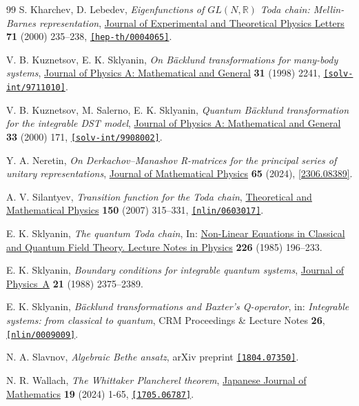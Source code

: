 \documentclass[11pt]{article}
\numberwithin{equation}{section}
\theoremstyle{plain}
\theoremstyle{definition}
\begin{document}
\begin{thebibliography}{99}
	 S. Kharchev, D. Lebedev, \textit{Eigenfunctions of $GL(N,\mathbb{R})$ Toda chain: Mellin-Barnes representation}, \href{https://doi.org/10.1134/1.568323}{Journal of Experimental and Theoretical Physics Letters} \textbf{71} (2000) 235--238, \href{https://doi.org/10.48550/arXiv.hep-th/0004065}{\tt [hep-th/0004065]}.
	
	 V. B. Kuznetsov, E. K. Sklyanin, \textit{On B\"acklund transformations for many-body systems}, \href{https://doi.org/10.1088/0305-4470/31/9/012}{Journal of Physics A: Mathematical and General} \textbf{31} (1998) 2241, \href{https://doi.org/10.48550/arXiv.solv-int/9711010}{\tt [solv-int/9711010]}.
	
	 V. B. Kuznetsov, M. Salerno, E. K. Sklyanin, \textit{Quantum B\"acklund transformation for the integrable DST model}, \href{https://doi.org/10.1088/0305-4470/33/1/311}{Journal of Physics A: Mathematical and General} \textbf{33} (2000) 171, \href{https://doi.org/10.48550/arXiv.solv-int/9908002}{\tt [solv-int/9908002]}.
	
	 Y. A. Neretin, \textit{On Derkachov--Manashov R-matrices for the principal series of unitary representations}, \href{https://doi.org/10.1063/5.0175714}{Journal of Mathematical Physics} \textbf{65} (2024), \href{https://doi.org/10.48550/arXiv.2306.08389}{[2306.08389]}.
	
	 A. V. Silantyev, \textit{Transition function for the Toda chain}, \href{https://doi.org/10.1007/s11232-007-0024-1}{Theoretical and Mathematical Physics} \textbf{150} (2007) 315--331, \href{https://doi.org/10.48550/arXiv.nlin/0603017}{\tt [nlin/0603017]}.
	
	 E. K. Sklyanin, \textit{The quantum Toda chain}, In: \href{https://doi.org/10.1007/3-540-15213-X_80}{Non-Linear Equations in Classical and Quantum Field Theory. Lecture Notes in Physics} \textbf{226} (1985) 196--233.
	
	 E. K. Sklyanin, \textit{Boundary conditions for integrable quantum systems}, \href{https://doi.org/10.1088/0305-4470/21/10/015}{Journal of Physics~A} \textbf{21} (1988) 2375--2389.
	
	 E. K. Sklyanin, \textit{B\"acklund transformations and Baxter’s Q-operator}, in: \textit{Integrable systems: from classical to quantum}, CRM Proceedings \& Lecture Notes \textbf{26}, \href{https://doi.org/10.48550/arXiv.nlin/0009009}{\tt [nlin/0009009]}.
	
	 N. A. Slavnov, \textit{Algebraic Bethe ansatz}, arXiv preprint \href{https://doi.org/10.48550/arXiv.1804.07350}{\tt [1804.07350]}.
	
	 N. R. Wallach, \textit{The Whittaker Plancherel theorem}, \href{https://doi.org/10.1007/s11537-023-2230-5}{Japanese Journal of Mathematics} \textbf{19} (2024) 1-65, \href{https://doi.org/10.48550/arXiv.1705.06787}{\tt [1705.06787]}.
	
\end{thebibliography}
\end{document}
